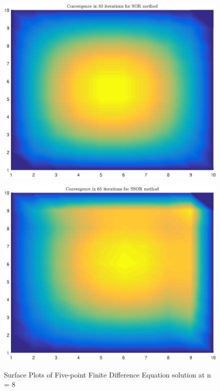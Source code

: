\documentclass[11pt]{article}
\begin{document}
\begin{figure}
\begin{minipage}{.45\textwidth}
\label{fig:test2}
\end{minipage}\hfill
\\
\begin{minipage}{.45\textwidth}
\centering
\includegraphics[width=\linewidth]{math609_pa2_comp_example_2_8_n_SOR.eps}
\label{fig:test3}
\end{minipage}\hfill
\begin{minipage}{.45\textwidth}
\centering
\includegraphics[width=\linewidth]{math609_pa2_comp_example_2_8_n_SSOR.eps}
\label{fig:test3}
\end{minipage}\hfill
\caption{Surface Plots of Five-point Finite Difference Equation solution at n = 8}
\end{figure}
\end{document}
